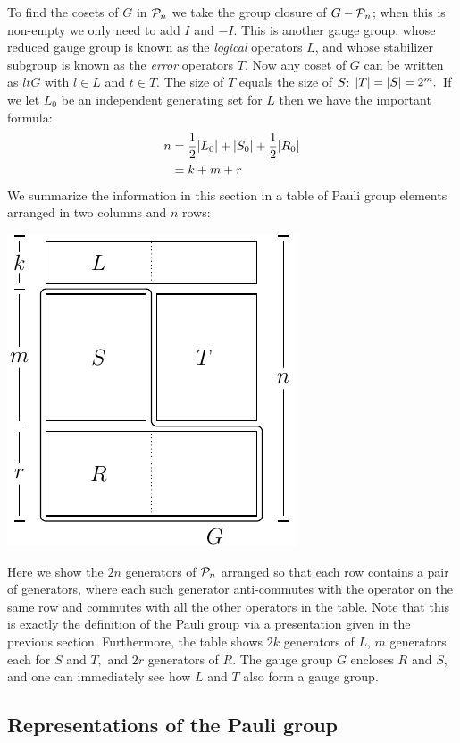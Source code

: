 To find the cosets of $G$ in $\mathcal{P}_n$ we take
the group closure of $G-\mathcal{P}_n$; when this is non-empty
we only need to add $I$ and $-I.$
This is another
gauge group, whose reduced gauge group is known as
the {\it logical} operators $L$, and whose 
stabilizer subgroup is known as the {\it error} operators $T.$
Now any coset of $G$ can be written as $ltG$ with
$l\in L$ and $t\in T.$
The size of $T$ equals the size of $S$: $|T|=|S|=2^m.$
If we let $L_0$ be an independent generating set for $L$
then we have the important formula:
\begin{align}
n &= \frac{1}{2}|L_0| + |S_0| + \frac{1}{2}|R_0|\\
  &= k + m + r
\end{align}
We summarize the information in this section in a table
of Pauli group elements arranged in
two columns and $n$ rows:
\begin{center}
\includegraphics[]{pic-canonical.pdf}
\end{center}
Here we show the $2n$ generators of $\mathcal{P}_n$ arranged 
so that each row contains a pair of generators,
where each such generator anti-commutes with the operator on the same row and
commutes with all the other operators in the table.
Note that this is exactly the definition of the Pauli group
via a presentation given in the previous section.
Furthermore, the table shows $2k$ generators
of $L$, $m$ generators each for $S$ and $T,$ and $2r$
generators of $R.$
The gauge group $G$ encloses $R$ and $S$, and one can
immediately see how $L$ and $T$ also form a gauge group.


\subsection{Representations of the Pauli group}


